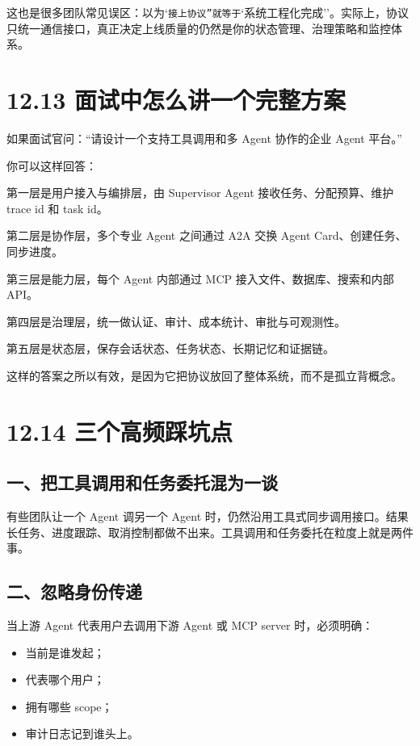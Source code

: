 这也是很多团队常见误区：以为`\texttt{接上协议''就等于}`系统工程化完成''。实际上，协议只统一通信接口，真正决定上线质量的仍然是你的状态管理、治理策略和监控体系。


\section{12.13 面试中怎么讲一个完整方案}

如果面试官问：``请设计一个支持工具调用和多 Agent 协作的企业 Agent 平台。''

你可以这样回答：


第一层是用户接入与编排层，由 Supervisor Agent 接收任务、分配预算、维护 trace id 和 task id。

第二层是协作层，多个专业 Agent 之间通过 A2A 交换 Agent Card、创建任务、同步进度。

第三层是能力层，每个 Agent 内部通过 MCP 接入文件、数据库、搜索和内部 API。

第四层是治理层，统一做认证、审计、成本统计、审批与可观测性。

第五层是状态层，保存会话状态、任务状态、长期记忆和证据链。


这样的答案之所以有效，是因为它把协议放回了整体系统，而不是孤立背概念。


\section{12.14 三个高频踩坑点}

\subsection{一、把工具调用和任务委托混为一谈}

有些团队让一个 Agent 调另一个 Agent 时，仍然沿用工具式同步调用接口。结果长任务、进度跟踪、取消控制都做不出来。工具调用和任务委托在粒度上就是两件事。


\subsection{二、忽略身份传递}

当上游 Agent 代表用户去调用下游 Agent 或 MCP server 时，必须明确：


\begin{itemize}[leftmargin=2em]
\item 当前是谁发起；
\item 代表哪个用户；
\item 拥有哪些 scope；
\item 审计日志记到谁头上。
\end{itemize}

